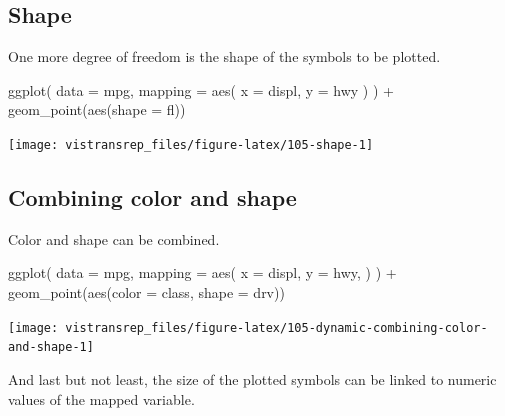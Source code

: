 \documentclass[]{book}
\newenvironment{Shaded}{}{}
\newcommand{\DataTypeTok}[1]{#1}
\newcommand{\KeywordTok}[1]{\textcolor[rgb]{0.00,0.00,1.00}{#1}}
\newcommand{\NormalTok}[1]{#1}
\newcommand{\OperatorTok}[1]{#1}
\newcommand{\StringTok}[1]{\textcolor[rgb]{0.00,0.50,0.50}{#1}}
\begin{document}
\hypertarget{shape}{%
\subsection{Shape}\label{shape}}

One more degree of freedom is the shape of the symbols to be plotted.

\begin{Shaded}
\begin{Highlighting}[]
\KeywordTok{ggplot}\NormalTok{(}
  \DataTypeTok{data =}\NormalTok{ mpg,}
  \DataTypeTok{mapping =} \KeywordTok{aes}\NormalTok{(}
    \DataTypeTok{x =}\NormalTok{ displ,}
    \DataTypeTok{y =}\NormalTok{ hwy}
\NormalTok{  )}
\NormalTok{) }\OperatorTok{+}
\StringTok{  }\KeywordTok{geom_point}\NormalTok{(}\KeywordTok{aes}\NormalTok{(}\DataTypeTok{shape =}\NormalTok{ fl))}
\end{Highlighting}
\end{Shaded}

\begin{flushright}\texttt{[image: vistransrep\_files/figure-latex/105-shape-1]} \end{flushright}

\hypertarget{combining-color-and-shape}{%
\subsection{Combining color and shape}\label{combining-color-and-shape}}

Color and shape can be combined.

\begin{Shaded}
\begin{Highlighting}[]
\KeywordTok{ggplot}\NormalTok{(}
  \DataTypeTok{data =}\NormalTok{ mpg,}
  \DataTypeTok{mapping =} \KeywordTok{aes}\NormalTok{(}
    \DataTypeTok{x =}\NormalTok{ displ,}
    \DataTypeTok{y =}\NormalTok{ hwy,}
\NormalTok{  )}
\NormalTok{) }\OperatorTok{+}
\StringTok{  }\KeywordTok{geom_point}\NormalTok{(}\KeywordTok{aes}\NormalTok{(}\DataTypeTok{color =}\NormalTok{ class, }\DataTypeTok{shape =}\NormalTok{ drv))}
\end{Highlighting}
\end{Shaded}

\begin{flushright}\texttt{[image: vistransrep\_files/figure-latex/105-dynamic-combining-color-and-shape-1]} \end{flushright}

And last but not least, the size of the plotted symbols can be linked to numeric values of the mapped variable.
\end{document}
